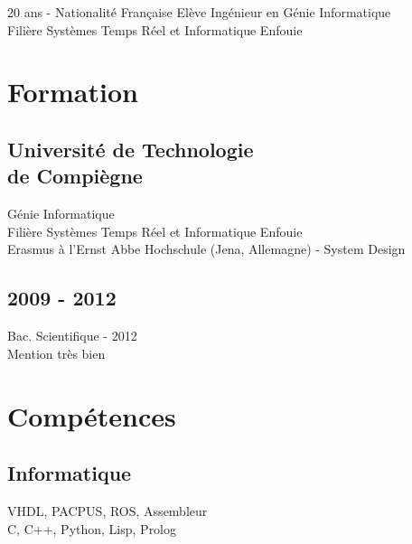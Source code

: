 \documentclass[]{cv-template}
\begin{document}
%
%
{20 ans - Nationalité Française}
{Elève Ingénieur en Génie Informatique \\Filière Systèmes Temps Réel et Informatique Enfouie}
{}
    
%
%
\begin{minipage}[t]{0.34\textwidth} 

\section{Formation} 

\subsection[Université de Technologie de Compiègne]{Université de Technologie \\de Compiègne}
\faCaretRight Génie Informatique \\
\faCaretRight Filière Systèmes Temps Réel et Informatique Enfouie\\
\faCaretRight Erasmus à l'Ernst Abbe Hochschule (Jena, Allemagne) - System Design\\
\sectionsep

\subsection{2009 - 2012}
\faCaretRight Bac. Scientifique - 2012 \\
\faCaretRight Mention très bien \\
\sectionsep

\section{Compétences}
\subsection{Informatique}
VHDL, PACPUS, ROS, Assembleur\\
C, C++, Python, Lisp, Prolog\\ 


\end{minipage}
\end{document}
